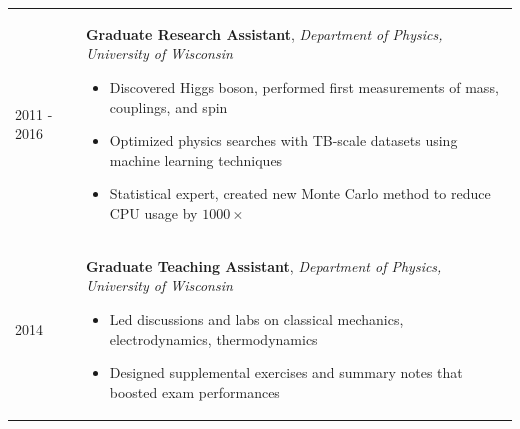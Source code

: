 \documentclass{letter}
\begin{document}
\begin{tabular}{p{}p{}}
  2011 - 2016
  &
  \textbf{Graduate Research Assistant}, \textit{Department of Physics, University of Wisconsin} \newline
  \vspace{-15pt}  %
  \begin{itemize}
    \itemsep0em
    \renewcommand{\labelitemi}{\tiny$\blacksquare$}
    \item Discovered Higgs boson, performed first measurements of mass, couplings, and spin 
    \item Optimized physics searches with TB-scale datasets using machine learning techniques
    \item Statistical expert, created new Monte Carlo method to reduce CPU usage by $1000\times$
  \end{itemize}
  \\

  2014
  & 
  \textbf{Graduate Teaching Assistant}, \textit{Department of Physics, University of Wisconsin} \newline
  \vspace{-15pt}  %
  \begin{itemize}
    \itemsep0em
    \renewcommand{\labelitemi}{\tiny$\blacksquare$} 
    \item Led discussions and labs on classical mechanics, electrodynamics, thermodynamics
    \item Designed supplemental exercises and summary notes that boosted exam performances
  \end{itemize}
  \\


\end{tabular}
\end{document}
